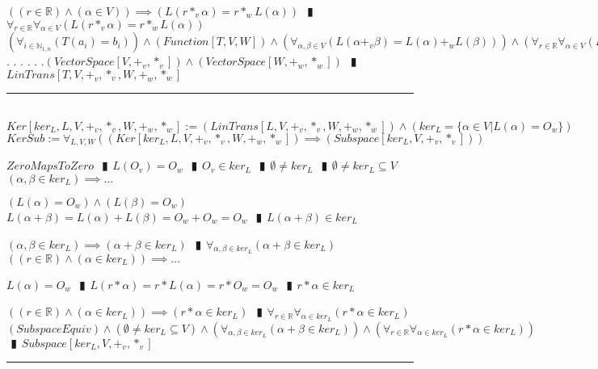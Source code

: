 \documentclass{book}
\newcommand{\abr}{:=}
\newcommand{\cont}{\phantom{.}. . .\phantom{.}}
\newcommand{\pipe}{$\phantom{(}\vrectangleblack\phantom{)}$}
\newcommand{\pr}[1]{\left(#1\right)}
\begin{document}
\begin{enumerate}
  \lit $\pr{(r \in \mathbb{R}) \land (\alpha \in V)} \implies \pr{L(r *_v \alpha) = r *_w L(\alpha)}$ \pipe $\forall_{r \in \mathbb{R}} \forall_{\alpha \in V}\pr{L(r *_v \alpha) = r *_w L(\alpha)}$
  \lit $\pr{\forall_{i \in \mathbb{N}_{1, n}}\pr{T(a_i) = b_i}} \land (Function[T, V, W]) \land \pr{\forall_{\alpha, \beta \in V}\pr{L(\alpha +_v \beta) = L(\alpha) +_w L(\beta)}} \land \pr{\forall_{r \in \mathbb{R}} \forall_{\alpha \in V}\pr{L(r *_v \alpha) = r *_w L(\alpha)}} \land$ \cont
  \lit \cont $(VectorSpace[V, +_v, *_v]) \land (VectorSpace[W, +_w, *_w])$ \pipe $LinTrans[T, V, +_v, *_v, W, +_w, *_w]$
\end{enumerate} \vspace{.75mm} \hrule \vspace{.75mm} \ \\ 

$Ker[ker_L, L, V, +_v, *_v, W, +_w, *_w] \abr (LinTrans[L, V, +_v, *_v, W, +_w, *_w]) \land \pr{ker_L = \{\alpha \in V | L(\alpha) = O_w\}}$ \\

$KerSub \abr \forall_{L, V, W}\pr{(Ker[ker_L, L, V, +_v, *_v, W, +_w, *_w]) \implies (Subspace[ker_L, V, +_v, *_v])}$
\begin{enumerate}
  \lit $ZeroMapsToZero$ \pipe $L(O_v) = O_w$ \pipe $O_v \in ker_L$ \pipe $\emptyset \neq ker_L$ \pipe $\emptyset \neq ker_L \subseteq V$
  \lit $(\alpha, \beta \in ker_L) \implies \ldots$
  \begin{enumerate}
    \lit $\pr{L(\alpha) = O_w} \land \pr{L(\beta) = O_w}$ \lit $L(\alpha + \beta) = L(\alpha) + L(\beta) = O_w + O_w = O_w$ \pipe $L(\alpha + \beta) \in ker_L$
  \end{enumerate}
  \lit $(\alpha, \beta \in ker_L) \implies (\alpha + \beta \in ker_L)$ \pipe $\forall_{\alpha, \beta \in ker_L}(\alpha + \beta \in ker_L)$
  \lit $\pr{(r \in \mathbb{R}) \land (\alpha \in ker_L)} \implies \ldots$
  \begin{enumerate}
    \lit $L(\alpha) = O_w$ \pipe $L(r * \alpha) = r * L(\alpha) = r * O_w = O_w$ \pipe $r * \alpha \in ker_L$
  \end{enumerate}
  \lit $\pr{(r \in \mathbb{R}) \land (\alpha \in ker_L)} \implies (r * \alpha \in ker_L)$ \pipe $\forall_{r \in \mathbb{R}} \forall_{\alpha \in ker_L}(r * \alpha \in ker_L)$
  \lit $(SubspaceEquiv) \land (\emptyset \neq ker_L \subseteq V) \land \pr{\forall_{\alpha, \beta \in ker_L}(\alpha + \beta \in ker_L)} \land \pr{\forall_{r \in \mathbb{R}} \forall_{\alpha \in ker_L}(r * \alpha \in ker_L)}$ \pipe $Subspace[ker_L, V, +_v, *_v]$
\end{enumerate} \vspace{.75mm} \hrule \vspace{.75mm} \ \\ 
\end{document}
